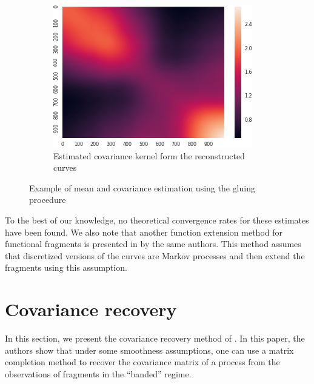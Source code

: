 \documentclass[10pt, a4paper]{report}
\theoremstyle{definition}
\theoremstyle{remark}
\begin{document}
\begin{figure}[ht]
	
	\begin{subfigure}{.4\textwidth}
		\centering
		\includegraphics[width=.8\linewidth]{Code/images/23/cov}
		\caption{\centering Estimated covariance kernel form the reconstructed curves }
	\end{subfigure}
	\caption{Example of mean and covariance estimation using the gluing procedure}
	\label{fig:gluingex}
\end{figure}
To the best of our knowledge, no theoretical convergence rates for these estimates have been found. We also note that another function extension method for functional fragments is presented in \cite{DH2} by the same authors. This method assumes that discretized versions of the curves are Markov processes and then extend the fragments using this assumption.



\section{Covariance recovery}
In this section, we present the covariance recovery method of \cite{DP2}. In this paper, the authors show that under some smoothness assumptions, one can use a matrix completion method to recover the covariance matrix of a process from the observations of fragments in the ``banded'' regime. 
\end{document}
